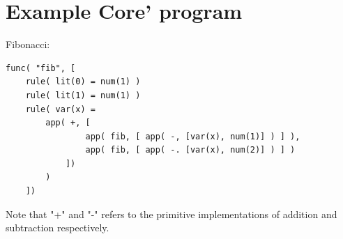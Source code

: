 \section{Example Core' program}

Fibonacci:

\begin{lstlisting}
func( "fib", [
	rule( lit(0) = num(1) )
	rule( lit(1) = num(1) )
	rule( var(x) = 
		app( +, [
				app( fib, [ app( -, [var(x), num(1)] ) ] ), 
				app( fib, [ app( -. [var(x), num(2)] ) ] )
			])
		)
	])
\end{lstlisting}

Note that "+" and "-" refers to the primitive implementations of addition 
and subtraction respectively.

